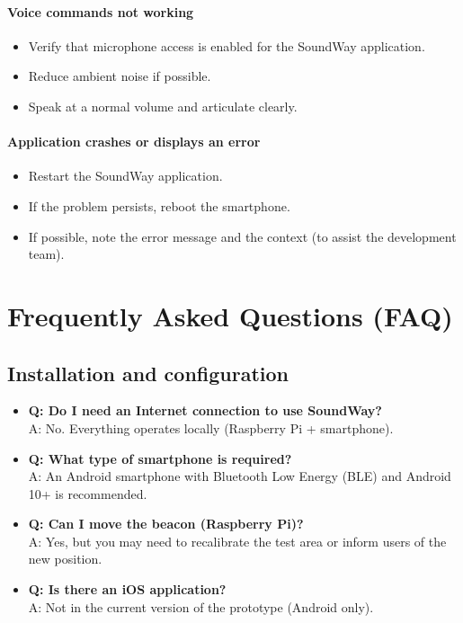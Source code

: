 \documentclass[12pt,a4paper]{article}
\begin{document}
\paragraph{Voice commands not working}
\begin{itemize}
    \item Verify that microphone access is enabled for the SoundWay application.
    \item Reduce ambient noise if possible.
    \item Speak at a normal volume and articulate clearly.
\end{itemize}

\paragraph{Application crashes or displays an error}
\begin{itemize}
    \item Restart the SoundWay application.
    \item If the problem persists, reboot the smartphone.
    \item If possible, note the error message and the context (to assist the development team).
\end{itemize}

\newpage
\section{Frequently Asked Questions (FAQ)}

\subsection{Installation and configuration}

\begin{itemize}
    \item \textbf{Q: Do I need an Internet connection to use SoundWay?}\\
    A: No. Everything operates locally (Raspberry Pi + smartphone).

    \item \textbf{Q: What type of smartphone is required?}\\
    A: An Android smartphone with Bluetooth Low Energy (BLE) and Android 10+ is recommended.

    \item \textbf{Q: Can I move the beacon (Raspberry Pi)?}\\
    A: Yes, but you may need to recalibrate the test area or inform users of the new position.

    \item \textbf{Q: Is there an iOS application?}\\
    A: Not in the current version of the prototype (Android only).
\end{itemize}
\end{document}
